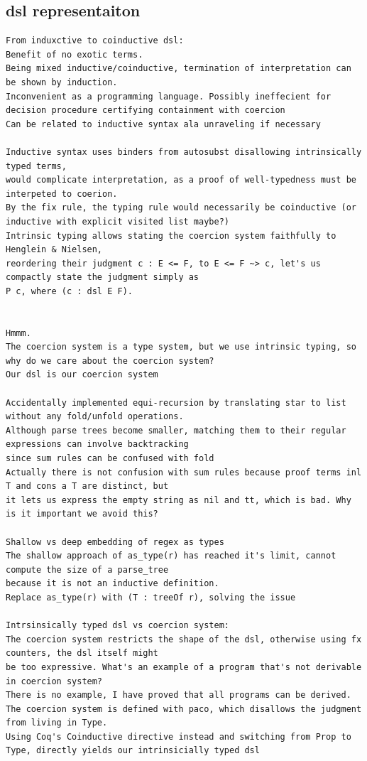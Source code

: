 \documentclass[a4paper,UKenglish,cleveref, autoref, thm-restate]{lipics-v2021}
\begin{document}
\subsection{dsl representaiton}
\begin{verbatim}
From induxctive to coinductive dsl:
Benefit of no exotic terms.
Being mixed inductive/coinductive, termination of interpretation can be shown by induction.
Inconvenient as a programming language. Possibly ineffecient for decision procedure certifying containment with coercion 
Can be related to inductive syntax ala unraveling if necessary

Inductive syntax uses binders from autosubst disallowing intrinsically typed terms, 
would complicate interpretation, as a proof of well-typedness must be interpeted to coerion.
By the fix rule, the typing rule would necessarily be coinductive (or inductive with explicit visited list maybe?) 
Intrinsic typing allows stating the coercion system faithfully to Henglein & Nielsen,
reordering their judgment c : E <= F, to E <= F ~> c, let's us compactly state the judgment simply as
P c, where (c : dsl E F).


Hmmm.
The coercion system is a type system, but we use intrinsic typing, so why do we care about the coercion system?
Our dsl is our coercion system

Accidentally implemented equi-recursion by translating star to list without any fold/unfold operations.
Although parse trees become smaller, matching them to their regular expressions can involve backtracking
since sum rules can be confused with fold
Actually there is not confusion with sum rules because proof terms inl T and cons a T are distinct, but
it lets us express the empty string as nil and tt, which is bad. Why is it important we avoid this?

Shallow vs deep embedding of regex as types
The shallow approach of as_type(r) has reached it's limit, cannot compute the size of a parse_tree 
because it is not an inductive definition.
Replace as_type(r) with (T : treeOf r), solving the issue

Intrsinsically typed dsl vs coercion system:
The coercion system restricts the shape of the dsl, otherwise using fx counters, the dsl itself might
be too expressive. What's an example of a program that's not derivable in coercion system?
There is no example, I have proved that all programs can be derived.
The coercion system is defined with paco, which disallows the judgment from living in Type.
Using Coq's Coinductive directive instead and switching from Prop to Type, directly yields our intrinsicially typed dsl


\end{verbatim}
\end{document}
